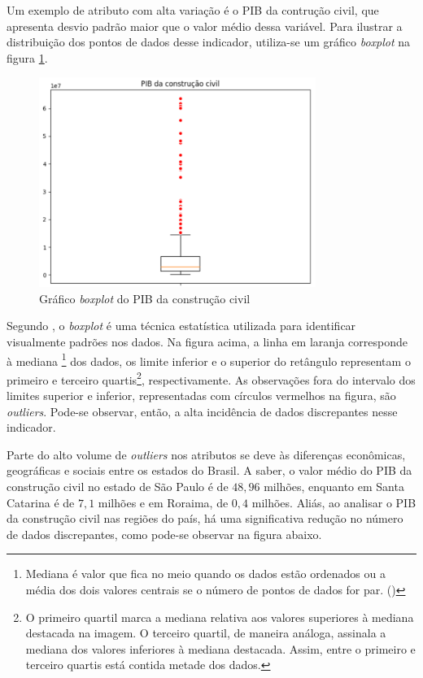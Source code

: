 Um exemplo de atributo com alta variação é o PIB da contrução civil,
que apresenta desvio padrão maior que o valor médio dessa variável.
Para ilustrar a distribuição dos pontos de dados desse indicador, utiliza-se 
um gráfico \textit{boxplot} na figura \ref{fig:boxplot_pibcc}.

\begin{figure}[H]
    \centering
    \includegraphics[width=9cm]{../figuras/graficos/boxplot-pib-cc.png}
    \caption{Gráfico \textit{boxplot} do PIB da construção civil}
    \label{fig:boxplot_pibcc}
\end{figure}

Segundo \citet{boxplot}, o \textit{boxplot} é
uma técnica estatística utilizada para identificar visualmente padrões nos dados. 
Na figura acima, a linha em laranja corresponde à mediana \footnote{Mediana é
valor que fica no meio quando os dados estão ordenados ou a média
dos dois valores centrais se o número de pontos de dados for par.
(\cite{boxplot-stat})} 
dos dados, os limite inferior e o superior do retângulo representam
o primeiro e terceiro quartis\footnote{O primeiro quartil marca a mediana 
relativa aos valores superiores à mediana destacada na imagem. O terceiro quartil,
de maneira análoga, assinala a mediana dos valores inferiores à mediana destacada. 
Assim, entre o primeiro e terceiro quartis está contida metade
dos dados.}, respectivamente. As observações fora do intervalo dos limites 
superior e inferior, representadas com círculos vermelhos na figura, são 
\textit{outliers}. Pode-se observar, então, a alta incidência de dados discrepantes
nesse indicador.

Parte do alto volume de \textit{outliers} nos atributos se deve às diferenças
econômicas, geográficas e sociais entre os estados do Brasil. A saber, o valor 
médio do PIB da construção civil no estado 
de São Paulo é de $48,96$ milhões, enquanto em Santa Catarina é de $7,1$ milhões e 
em Roraima, de $0,4$ milhões. Aliás, ao analisar o PIB da construção civil nas 
regiões do país, há uma significativa redução no número de dados discrepantes, como 
pode-se observar na figura abaixo.

